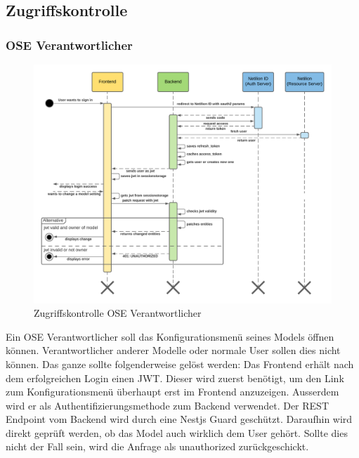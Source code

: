 \subsection{Zugriffskontrolle}
\subsubsection{OSE Verantwortlicher}
\begin{figure}[H]
  \centering
  \includegraphics[width=.95\linewidth]{./images/zugriffskontrolle.png}
  \caption[{Sequenzdiagram, welches die Zugriffskontrolle für den OSE Verantwortlichen beschreibt}]{Zugriffskontrolle OSE Verantwortlicher}
  \label{fig:zugriffskontrolle}
\end{figure}
Ein OSE Verantwortlicher soll das Konfigurationsmenü seines Models öffnen können. Verantwortlicher anderer Modelle oder normale User sollen dies nicht können.
Das ganze sollte folgenderweise gelöst werden:
\newline
Das Frontend erhält nach dem erfolgreichen Login einen JWT. Dieser wird zuerst benötigt, um den Link zum Konfigurationsmenü überhaupt erst im Frontend anzuzeigen. Ausserdem wird er als Authentifizierungsmethode zum Backend verwendet. Der REST Endpoint vom Backend wird durch eine Nestjs Guard\cite{nest_guards} geschützt. Daraufhin wird direkt geprüft werden, ob das Model auch wirklich dem User gehört. Sollte dies nicht der Fall sein, wird die Anfrage als unauthorized zurückgeschickt.
